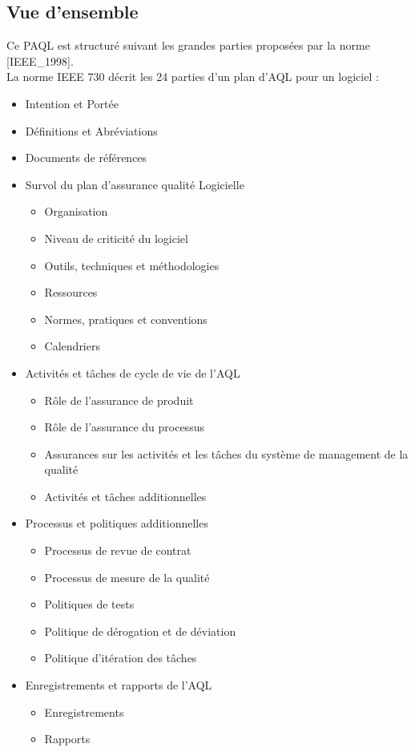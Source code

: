 \documentclass[a4paper,11pt,titlepage]{article}
\begin{document}
\subsection{Vue d'ensemble}%
Ce PAQL est structuré suivant les grandes parties proposées par la norme [IEEE\_1998].\\
La norme IEEE 730 décrit les 24 parties d'un plan d'AQL pour un logiciel :
\begin{itemize}
    \item Intention et Portée
    \item Définitions et Abréviations
    \item Documents de références
    \item Survol du plan d'assurance qualité Logicielle
    \begin{itemize}
        \item Organisation
        \item Niveau de criticité du logiciel
        \item Outils, techniques et méthodologies
        \item Ressources
        \item Normes, pratiques et conventions
        \item Calendriers
    \end{itemize}
    \item Activités et tâches de cycle de vie de l'AQL
    \begin{itemize}
        \item Rôle de l'assurance de produit
        \item Rôle de l'assurance du processus
        \item Assurances sur les activités et les tâches du système de management de la qualité
        \item Activités et tâches additionnelles
    \end{itemize}
    \item Processus et politiques additionnelles
    \begin{itemize}
        \item Processus de revue de contrat
        \item Processus de mesure de la qualité
        \item Politiques de tests
              \item Politique de dérogation et de déviation
              \item Politique d'itération des tâches
            \end{itemize}
            \item Enregistrements et rapports de l'AQL
            \begin{itemize}
                \item Enregistrements
                \item Rapports
            \end{itemize}
        \end{itemize}
\end{document}
